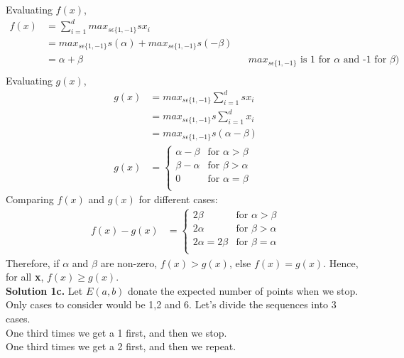 \documentclass[11pt]{article}
\begin{document}
Evaluating $f(x)$,
\begin{align*}
f(x) & = \sum_{i=1}^{d} max_{s\epsilon\{1,-1\}} sx_i \\
& =  max_{s\epsilon\{1,-1\}} s(\alpha) + max_{s\epsilon\{1,-1\}} s(-\beta)\\
& =  \alpha + \beta && \text{$max_{s\epsilon\{1,-1\}}$ is 1 for $\alpha$ and -1 for $\beta$)}\\
\end{align*}
\linebreak
Evaluating $g(x)$,
\begin{equation*}\
\begin{split}
g(x) & = max_{s\epsilon\{1,-1\}}\sum_{i=1}^{d} sx_i \\
& = max_{s\epsilon\{1,-1\}}s\sum_{i=1}^{d} x_i \\
& = max_{s\epsilon\{1,-1\}}s(\alpha - \beta)\\
g(x) & = \begin{cases}
\alpha - \beta & \text{for } \alpha > \beta \\
\beta - \alpha & \text{for } \beta > \alpha \\
0 & \text{for } \alpha = \beta \\
\end{cases}
\end{split}
\end{equation*}
Comparing $f(x)$ and $g(x)$ for different cases:
\begin{equation*}\
\begin{split}
f(x) - g(x) & = \begin{cases}
2\beta & \text{for } \alpha > \beta \\
2\alpha & \text{for } \beta > \alpha \\
2\alpha = 2\beta & \text{for } \beta = \alpha \\
\end{cases}
\end{split}
\end{equation*}
Therefore, if $\alpha$ and $\beta$ are non-zero, $f(x) > g(x)$, else $f(x) = g(x)$. Hence, for all \textbf{x}, $f(x) \geq g(x)$. \\
\linebreak
\textbf{Solution 1c.} Let $E(a, b)$ donate the expected number of points when we stop. Only cases to consider would be 1,2 and 6. Let's divide the sequences into 3 cases. \\
One third times we get a 1 first, and then we stop. \\
One third times we get a 2 first, and then we repeat. \\
\end{document}
